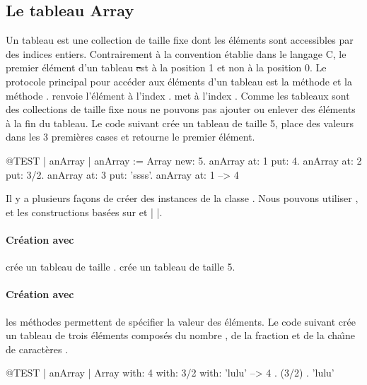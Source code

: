 \documentclass[a4paper,10pt,twoside]{book}
\begin{document}
\subsection{Le tableau Array}
Un tableau  est une collection de taille fixe
dont les \'el\'ements sont accessibles par des indices entiers.
Contrairement \`a la convention \'etablie dans le langage C,
le premier \'el\'ement d'un tableau \st est \`a la position 1 et
non \`a la position 0.
Le protocole principal pour acc\'eder aux \'el\'ements d'un tableau
est la m\'ethode
 et la m\'ethode .
  renvoie l'\'el\'ement \`a l'index 
.  met  \`a 
l'index . Comme les tableaux sont des collections de taille
fixe nous ne pouvons pas ajouter ou enlever des \'el\'ements \`a la fin du
tableau.
Le code suivant cr\'ee un tableau de taille 5, place des valeurs dans les 3
premi\`eres cases et retourne le premier \'el\'ement.

\begin{code}{@TEST | anArray | }
anArray := Array new: 5.
anArray at: 1 put: 4.
anArray at: 2 put: 3/2.
anArray at: 3 put: 'ssss'.
anArray at: 1 --> 4
\end{code}

Il y a plusieurs fa\c{c}ons de cr\'eer des instances de la classe 
. Nous pouvons utiliser ,  et les 
constructions bas\'ees sur \ct{#( )} et \ct|{ }|.

\paragraph{Cr\'eation avec }  cr\'ee un tableau de taille .
 cr\'ee un tableau de taille 5.

\paragraph{Cr\'eation avec } les m\'ethodes 
 permettent de sp\'ecifier la valeur des \'el\'ements.
Le code suivant cr\'ee un tableau de trois \'el\'ements compos\'es
du nombre
, de la fraction  et de la cha\^{\i}ne de caract\`eres
.

\begin{code}{@TEST | anArray |}
Array with: 4 with: 3/2 with: 'lulu' -->  {4 . (3/2) . 'lulu'}
\end{code}
\end{document}

